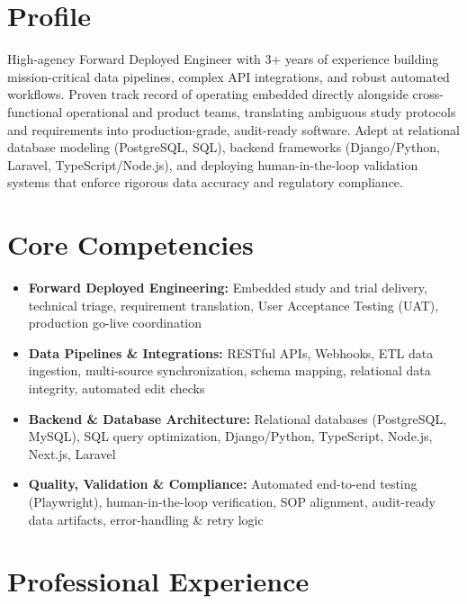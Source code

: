 \documentclass[11pt,a4paper,sans]{moderncv}
\begin{document}
\makecvtitle

\section{Profile}
High-agency Forward Deployed Engineer with 3+ years of experience building mission-critical data pipelines, complex API integrations, and robust automated workflows. Proven track record of operating embedded directly alongside cross-functional operational and product teams, translating ambiguous study protocols and requirements into production-grade, audit-ready software. Adept at relational database modeling (PostgreSQL, SQL), backend frameworks (Django/Python, Laravel, TypeScript/Node.js), and deploying human-in-the-loop validation systems that enforce rigorous data accuracy and regulatory compliance.

\section{Core Competencies}
\begin{itemize}
\item \textbf{Forward Deployed Engineering:} Embedded study and trial delivery, technical triage, requirement translation, User Acceptance Testing (UAT), production go-live coordination
\item \textbf{Data Pipelines \& Integrations:} RESTful APIs, Webhooks, ETL data ingestion, multi-source synchronization, schema mapping, relational data integrity, automated edit checks
\item \textbf{Backend \& Database Architecture:} Relational databases (PostgreSQL, MySQL), SQL query optimization, Django/Python, TypeScript, Node.js, Next.js, Laravel
\item \textbf{Quality, Validation \& Compliance:} Automated end-to-end testing (Playwright), human-in-the-loop verification, SOP alignment, audit-ready data artifacts, error-handling \& retry logic
\end{itemize}

\section{Professional Experience}
\end{document}
